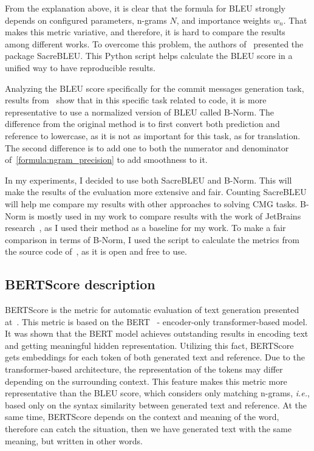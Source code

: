 From the explanation above, it is clear that the formula for BLEU strongly depends on configured parameters, n-grams $N$, and importance weights $w_n$. That makes this metric variative, and therefore, it is hard to compare the results among different works. To overcome this problem, the authors of~\cite{post2018call} presented the package SacreBLEU\@. This Python script helps calculate the BLEU score in a unified way to have reproducible results.

Analyzing the BLEU score specifically for the commit messages generation task, results from~\cite{tao2021evaluation} show that in this specific task related to code, it is more representative to use a normalized version of BLEU called B-Norm. The difference from the original method is to first convert both prediction and reference to lowercase, as it is not as important for this task, as for translation. The second difference is to add one to both the numerator and denominator of~\ref{formula:ngram_precision} to add smoothness to it.

In my experiments, I decided to use both SacreBLEU and B-Norm. This will make the results of the evaluation more extensive and fair. Counting SacreBLEU will help me compare my results with other approaches to solving CMG tasks. B-Norm is mostly used in my work to compare results with the work of JetBrains research~\cite{eliseeva2023commit}, as I used their method as a baseline for my work. To make a fair comparison in terms of B-Norm, I used the script to calculate the metrics from the source code of~\cite{eliseeva2023commit}, as it is open and free to use.

\subsection{BERTScore description}\label{subec:bertscore}
BERTScore is the metric for automatic evaluation of text generation presented at~\cite{zhang2019bertscore}. This metric is based on the BERT~\cite{devlin2018bert} {-} encoder-only transformer-based model. It was shown that the BERT model achieves outstanding results in encoding text and getting meaningful hidden representation. Utilizing this fact, BERTScore gets embeddings for each token of both generated text and reference. Due to the transformer-based architecture, the representation of the tokens may differ depending on the surrounding context. This feature makes this metric more representative than the BLEU score, which considers only matching n-grams, \textit{i.e.}, based only on the syntax similarity between generated text and reference. At the same time, BERTScore depends on the context and meaning of the word, therefore can catch the situation, then we have generated text with the same meaning, but written in other words.

